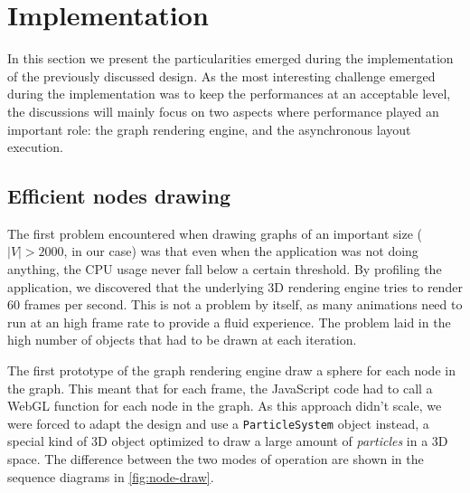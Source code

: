 \section{Implementation}
\label{sec:visu/implementation}

In this section we present the particularities emerged during the implementation of the previously discussed design. As the most interesting challenge emerged during the implementation was to keep the performances at an acceptable level, the discussions will mainly focus on two aspects where performance played an important role: the graph rendering engine, and the asynchronous layout execution.

\subsection{Efficient nodes drawing}

The first problem encountered when drawing graphs of an important size ($|V| > 2000$, in our case) was that even when the application was not doing anything, the CPU usage never fall below a certain threshold. By profiling the application, we discovered that the underlying 3D rendering engine tries to render 60 frames per second. This is not a problem by itself, as many animations need to run at an high frame rate to provide a fluid experience. The problem laid in the high number of objects that had to be drawn at each iteration.

The first prototype of the graph rendering engine draw a sphere for each node in the graph. This meant that for each frame, the JavaScript code had to call a WebGL function for each node in the graph. As this approach didn't scale, we were forced to adapt the design and use a \texttt{ParticleSystem} object instead, a special kind of 3D object optimized to draw a large amount of \emph{particles} in a 3D space. The difference between the two modes of operation are shown in the sequence diagrams in \vref{fig:node-draw}.

